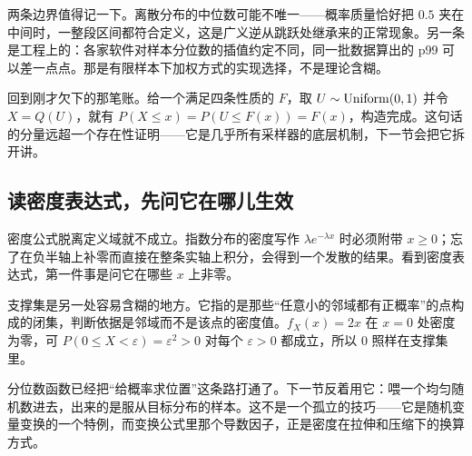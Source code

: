 \begin{remark}
两条边界值得记一下。离散分布的中位数可能不唯一——概率质量恰好把 \(0.5\) 夹在中间时，一整段区间都符合定义，这是广义逆从跳跃处继承来的正常现象。另一条是工程上的：各家软件对样本分位数的插值约定不同，同一批数据算出的 p99 可以差一点点。那是有限样本下加权方式的实现选择，不是理论含糊。
\end{remark}

回到刚才欠下的那笔账。给一个满足四条性质的 \(F\)，取 \(U\sim\operatorname{Uniform}(0,1)\) 并令 \(X=Q(U)\)，就有 \(P(X\le x)=P(U\le F(x))=F(x)\)，构造完成。这句话的分量远超一个存在性证明——它是几乎所有采样器的底层机制，下一节会把它拆开讲。

\subsection{读密度表达式，先问它在哪儿生效}

密度公式脱离定义域就不成立。指数分布的密度写作 \(\lambda e^{-\lambda x}\) 时必须附带 \(x\ge0\)；忘了在负半轴上补零而直接在整条实轴上积分，会得到一个发散的结果。看到密度表达式，第一件事是问它在哪些 \(x\) 上非零。

支撑集是另一处容易含糊的地方。它指的是那些``任意小的邻域都有正概率''的点构成的闭集，判断依据是邻域而不是该点的密度值。\(f_X(x)=2x\) 在 \(x=0\) 处密度为零，可 \(P(0\le X<\varepsilon)=\varepsilon^2>0\) 对每个 \(\varepsilon>0\) 都成立，所以 0 照样在支撑集里。

分位数函数已经把``给概率求位置''这条路打通了。下一节反着用它：喂一个均匀随机数进去，出来的是服从目标分布的样本。这不是一个孤立的技巧——它是随机变量变换的一个特例，而变换公式里那个导数因子，正是密度在拉伸和压缩下的换算方式。

